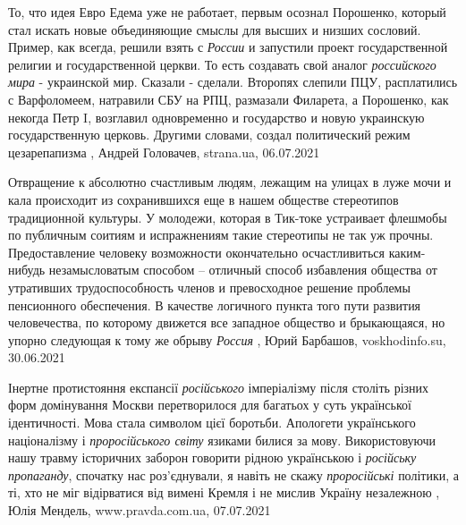 То, что идея Евро Едема уже не работает, первым осознал Порошенко, который стал
искать новые объединяющие смыслы для высших и низших сословий.  Пример, как
всегда, решили взять с \emph{России} и запустили проект государственной религии
и государственной церкви. То есть создавать свой аналог \emph{российского мира} -
украинской мир. Сказали - сделали. Второпях слепили ПЦУ, расплатились с
Варфоломеем, натравили СБУ на РПЦ, размазали Филарета, а Порошенко, как
некогда Петр I, возглавил одновременно и государство и новую украинскую
государственную церковь. Другими словами, создал политический режим
цезарепапизма
, 
Андрей Головачев, strana.ua, 06.07.2021

Отвращение к абсолютно счастливым людям, лежащим на улицах в луже мочи и кала
происходит из сохранившихся еще в нашем обществе стереотипов традиционной
культуры. У молодежи, которая в Тик-токе устраивает флешмобы по публичным
соитиям и испражнениям такие стереотипы не так уж прочны. Предоставление
человеку возможности окончательно осчастливиться каким-нибудь незамысловатым
способом – отличный способ избавления общества от утративших трудоспособность
членов и превосходное решение проблемы пенсионного обеспечения. В качестве
логичного пункта того пути развития человечества, по которому движется все
западное общество и брыкающаяся, но упорно следующая к тому же обрыву \emph{Россия}
, 
Юрий Барбашов, voskhodinfo.su, 30.06.2021

Інертне протистояння експансії \emph{російського} імперіалізму після століть
різних форм домінування Москви перетворилося для багатьох у суть української
ідентичності. Мова стала символом цієї боротьби.  Апологети українського
націоналізму і \emph{проросійського світу} язиками билися за мову.
Використовуючи нашу травму історичних заборон говорити рідною українською і
\emph{російську пропаганду}, спочатку нас роз’єднували, я навіть не скажу
\emph{проросійські} політики, а ті, хто не міг відірватися від вимені Кремля і
не мислив Україну незалежною
, 
Юлія Мендель, www.pravda.com.ua, 07.07.2021

